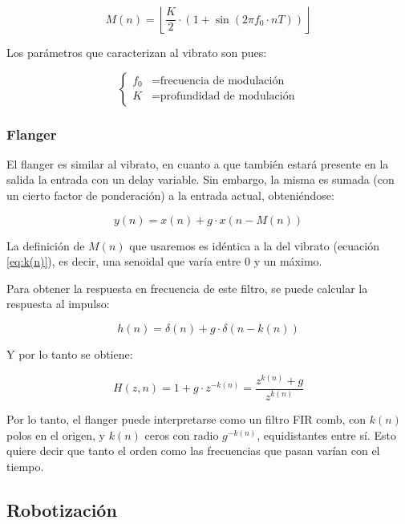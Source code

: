 \documentclass[assd_tp2_main.tex]{subfiles}
\begin{document}
\begin{equation}
	M(n) = \left \lfloor \frac{K}{2} \cdot 
		\left( 1 + \sin{\left(2\pi f_0 \cdot nT\right)} \right) \right \rfloor
		\label{eq:k(n)}
\end{equation}

Los par\'ametros que caracterizan al vibrato son pues:

\begin{equation}
	\left\{
	\begin{aligned}
		f_0	&= \text{frecuencia de modulaci\'on} \\
		K   	&= \text{profundidad de modulaci\'on}
	\end{aligned}	
	\right.
\end{equation}





\subsubsection{Flanger}

El flanger es similar al vibrato, en cuanto a que tambi\'en estar\'a presente en la salida la entrada con un delay variable. Sin embargo, la misma es sumada (con un cierto factor de ponderaci\'on) a la entrada actual, obteni\'endose:

\begin{equation}
	y(n) = x(n) + g\cdot x(n-M(n))
\end{equation}

La definici\'on de $M(n)$ que usaremos es id\'entica a la del vibrato (ecuaci\'on \ref{eq:k(n)}), es decir, una senoidal que var\'ia entre 0 y un m\'aximo. 

Para obtener la respuesta en frecuencia de este filtro, se puede calcular la respuesta al impulso:

\[
	h(n) = \delta (n) + g \cdot \delta (n-k(n))
\]

Y por lo tanto se obtiene:

\[
	H(z, n) = 1 + g\cdot z^{-k(n)} = \frac{z^{k(n)} + g}{z^{k(n)}}
\]

Por lo tanto, el flanger puede interpretarse como un filtro FIR comb, con $k(n)$ polos en el origen, y $k(n)$ ceros con radio $g^{-k(n)}$, equidistantes entre s\'i. Esto quiere decir que tanto el orden como las frecuencias que pasan var\'ian con el tiempo.




\subsection{Robotizaci\'on}
\end{document}
